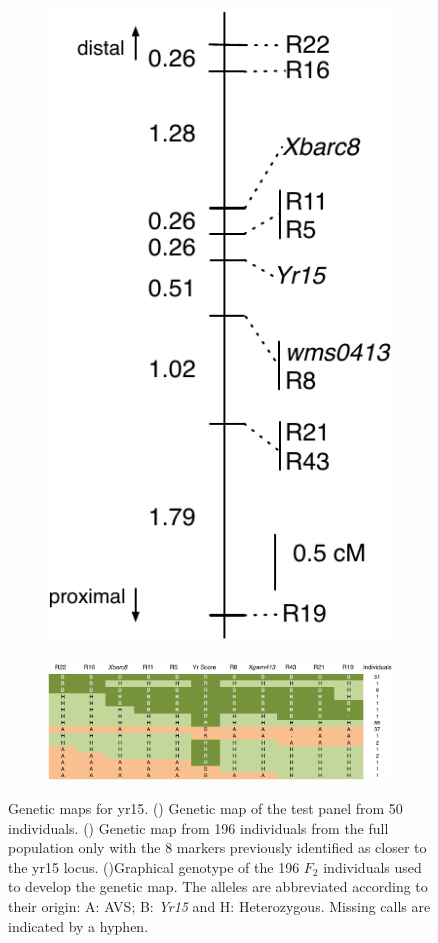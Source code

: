 \begin{figure}
\begin{subfigure}{0.45\textwidth}
	\includegraphics[height=0.45\textheight]{Yr15/Figures/selection/fineMap.pdf}
	\end{subfigure}

	\begin{subfigure}{1\textwidth}
	\caption{}
	\label{fig:yr15:mapDetails}
	\includegraphics[width=1\textwidth]{Yr15/Figures/selection/mapDetails.pdf}
	\end{subfigure}
	

	\caption{Genetic maps for \acrshort{yr15}. () Genetic map of the test panel from 50 individuals. () Genetic map from 196 individuals from the full population only with the 8 markers previously identified as closer to the \acrshort{yr15} locus. ()Graphical genotype of the 196 $F_{2}$ individuals used to develop the genetic map. The alleles are abbreviated according to their origin: A: AVS; B: \textit{Yr15} and H: Heterozygous. Missing calls are indicated by a hyphen.}
\end{figure}

